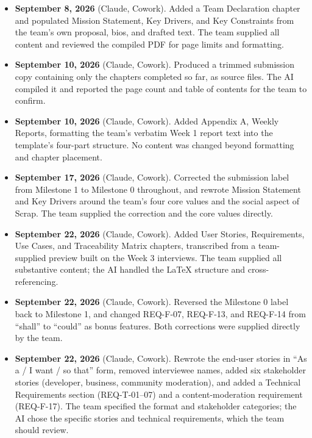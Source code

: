 \begin{itemize}[leftmargin=1.4em]

\item \textbf{September 8, 2026} (Claude, Cowork). Added a Team Declaration chapter and populated Mission Statement, Key Drivers, and Key Constraints from the team's own proposal, bios, and drafted text. The team supplied all content and reviewed the compiled PDF for page limits and formatting.

\item \textbf{September 10, 2026} (Claude, Cowork). Produced a trimmed submission copy containing only the chapters completed so far, as source files. The AI compiled it and reported the page count and table of contents for the team to confirm.

\item \textbf{September 10, 2026} (Claude, Cowork). Added Appendix A, Weekly Reports, formatting the team's verbatim Week 1 report text into the template's four-part structure. No content was changed beyond formatting and chapter placement.

\item \textbf{September 17, 2026} (Claude, Cowork). Corrected the submission label from Milestone 1 to Milestone 0 throughout, and rewrote Mission Statement and Key Drivers around the team's four core values and the social aspect of Scrap. The team supplied the correction and the core values directly.

\item \textbf{September 22, 2026} (Claude, Cowork). Added User Stories, Requirements, Use Cases, and Traceability Matrix chapters, transcribed from a team-supplied preview built on the Week 3 interviews. The team supplied all substantive content; the AI handled the LaTeX structure and cross-referencing.

\item \textbf{September 22, 2026} (Claude, Cowork). Reversed the Milestone 0 label back to Milestone 1, and changed REQ-F-07, REQ-F-13, and REQ-F-14 from ``shall'' to ``could'' as bonus features. Both corrections were supplied directly by the team.

\item \textbf{September 22, 2026} (Claude, Cowork). Rewrote the end-user stories in ``As a / I want / so that'' form, removed interviewee names, added six stakeholder stories (developer, business, community moderation), and added a Technical Requirements section (REQ-T-01--07) and a content-moderation requirement (REQ-F-17). The team specified the format and stakeholder categories; the AI chose the specific stories and technical requirements, which the team should review.


\end{itemize}

